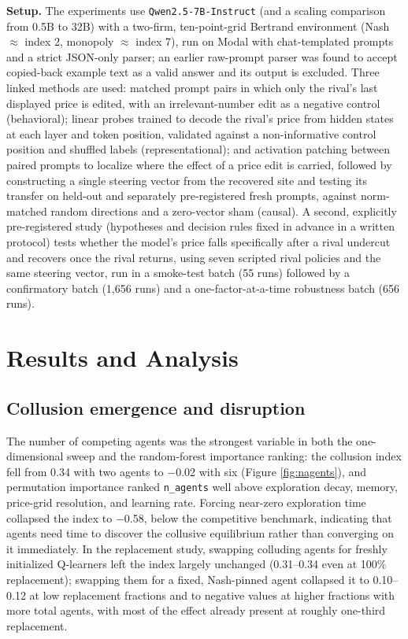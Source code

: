 \documentclass[11pt]{article}
\begin{document}
\textbf{Setup.} The experiments use \texttt{Qwen2.5-7B-Instruct} (and a scaling comparison from 0.5B to 32B) with a two-firm, ten-point-grid Bertrand environment (Nash $\approx$ index 2, monopoly $\approx$ index 7), run on Modal with chat-templated prompts and a strict JSON-only parser; an earlier raw-prompt parser was found to accept copied-back example text as a valid answer and its output is excluded. Three linked methods are used: matched prompt pairs in which only the rival's last displayed price is edited, with an irrelevant-number edit as a negative control (behavioral); linear probes trained to decode the rival's price from hidden states at each layer and token position, validated against a non-informative control position and shuffled labels (representational); and activation patching between paired prompts to localize where the effect of a price edit is carried, followed by constructing a single steering vector from the recovered site and testing its transfer on held-out and separately pre-registered fresh prompts, against norm-matched random directions and a zero-vector sham (causal). A second, explicitly pre-registered study (hypotheses and decision rules fixed in advance in a written protocol) tests whether the model's price falls specifically after a rival undercut and recovers once the rival returns, using seven scripted rival policies and the same steering vector, run in a smoke-test batch (55 runs) followed by a confirmatory batch (1,656 runs) and a one-factor-at-a-time robustness batch (656 runs).

\section{Results and Analysis}

\subsection{Collusion emergence and disruption}

The number of competing agents was the strongest variable in both the one-dimensional sweep and the random-forest importance ranking: the collusion index fell from 0.34 with two agents to $-$0.02 with six (Figure \ref{fig:nagents}), and permutation importance ranked \texttt{n\_agents} well above exploration decay, memory, price-grid resolution, and learning rate. Forcing near-zero exploration time collapsed the index to $-$0.58, below the competitive benchmark, indicating that agents need time to discover the collusive equilibrium rather than converging on it immediately. In the replacement study, swapping colluding agents for freshly initialized Q-learners left the index largely unchanged (0.31--0.34 even at 100\% replacement); swapping them for a fixed, Nash-pinned agent collapsed it to 0.10--0.12 at low replacement fractions and to negative values at higher fractions with more total agents, with most of the effect already present at roughly one-third replacement.
\end{document}
